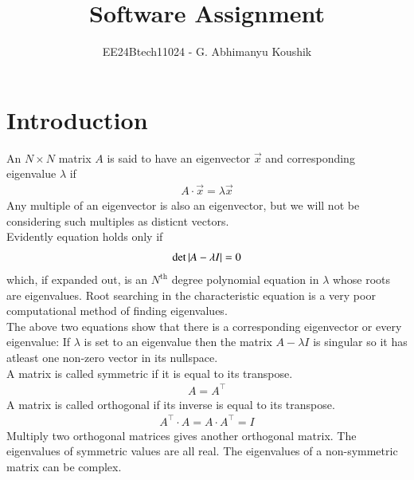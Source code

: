 \documentclass[a4paper,12pt]{article}
\theoremstyle{remark}
\begin{document}
\title{Software Assignment}
\author{EE24Btech11024 - G. Abhimanyu Koushik}
\maketitle
\renewcommand{\thefigure}{\theenumi}
\renewcommand{\thetable}{\theenumi}

\section*{Introduction}
An $N\times N$ matrix $A$ is said to have an eigenvector $\vec{x}$ and corresponding eigenvalue $\lambda$ if
\begin{align}
	A\cdot\vec{x} = \lambda\vec{x}
\end{align}
Any multiple of an eigenvector is also an eigenvector, but we will not be considering such multiples as disticnt vectors.\\
Evidently equation  holds only if
\begin{align}
	\det\left\vert A-\lambda I\right\vert = 0
\end{align}
which, if expanded out, is an $N^{\text{th}}$ degree polynomial equation in $\lambda$ whose roots are eigenvalues. Root searching in the characteristic equation  is a very poor computational method of finding eigenvalues.\\
The above two equations show that there is a corresponding eigenvector or every eigenvalue: If $\lambda$ is set to an eigenvalue then the matrix $A-\lambda I$ is singular so it has atleast one non-zero vector in its nullspace.\\
A matrix is called symmetric if it is equal to its transpose.
\begin{align}
	A = A^\top
\end{align}
A matrix is called orthogonal if its inverse is equal to its transpose.
\begin{align}
	A^\top\cdot A = A\cdot A^\top = I
\end{align}
Multiply two orthogonal matrices gives another orthogonal matrix.
The eigenvalues of symmetric values are all real. The eigenvalues of a non-symmetric matrix can be complex. 
\end{document}
